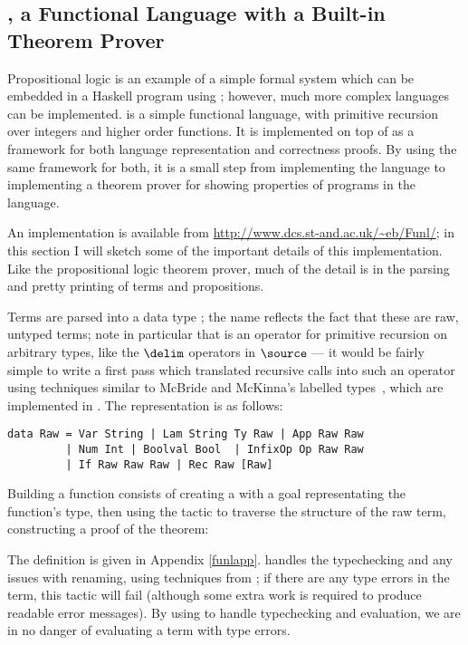 \subsection{\Funl{}, a Functional Language with a Built-in Theorem Prover}

\label{example2}

Propositional logic is an example of a simple formal system which can
be embedded in a Haskell program using \Ivor{}; however, much more
complex languages can be implemented. \Funl{} is a simple functional
language, with primitive recursion over integers and higher order
functions. It is implemented on top of \Ivor{} as a framework for both
language representation and correctness proofs. By using the same
framework for both, it
is a small step from implementing the language to implementing a
theorem prover for showing properties of programs in the language.

An implementation is available from
\url{http://www.dcs.st-and.ac.uk/~eb/Funl/}; in this section I will
sketch some of the important details of this implementation. Like the
propositional logic theorem prover, much of the detail is in the
parsing and pretty printing of terms and propositions.

Terms are parsed into a data type ; the name
 reflects the fact that these are raw, untyped terms; note
in particular that  is an operator for primitive recursion
on arbitrary types, like the $\delim$ operators in $\source$ --- it
would be fairly simple to write a first pass which translated
recursive calls into such an operator using techniques similar to
McBride and McKinna's labelled types~\cite{view-left}, which are
implemented in \Ivor{}. The representation is as follows:

\verb+data Raw = Var String | Lam String Ty Raw | App Raw Raw+\\
\verb+         | Num Int | Boolval Bool  | InfixOp Op Raw Raw+\\
\verb+         | If Raw Raw Raw | Rec Raw [Raw]+

Building a \Funl{} function consists of creating a  
with a goal representating the function's type, then using the
 tactic to traverse the
structure of the raw term, constructing a proof of the
theorem:


The definition is given in Appendix \ref{funlapp}.  \Ivor{} handles
the typechecking and any issues with renaming, using techniques from
\cite{not-a-number}; if there are any type errors in the 
term, this tactic will fail (although some extra work is required to
produce readable error messages). By using \Ivor{} to handle
typechecking and evaluation, we are in no danger of evaluating a term
with type errors.


